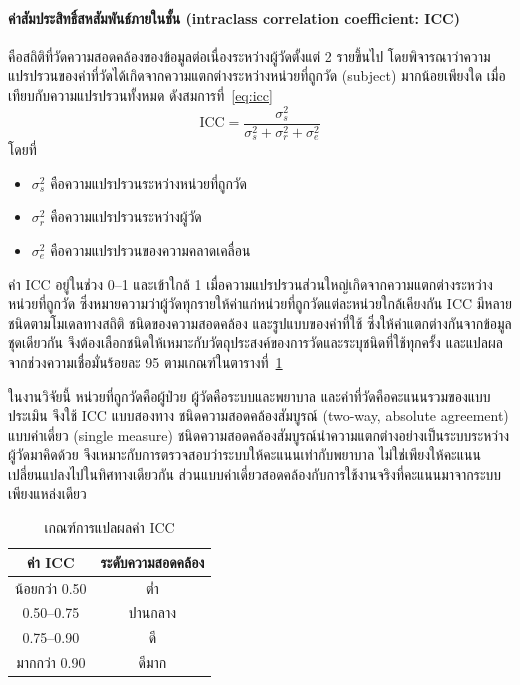 \paragraph{ค่าสัมประสิทธิ์สหสัมพันธ์ภายในชั้น (intraclass correlation coefficient: ICC)}
คือสถิติที่วัดความสอดคล้องของข้อมูลต่อเนื่องระหว่างผู้วัดตั้งแต่ 2 รายขึ้นไป
โดยพิจารณาว่าความแปรปรวนของค่าที่วัดได้เกิดจากความแตกต่างระหว่างหน่วยที่ถูกวัด (subject) มากน้อยเพียงใด
เมื่อเทียบกับความแปรปรวนทั้งหมด ดังสมการที่~\eqref{eq:icc}
\begin{equation}
\mathrm{ICC} = \frac{\sigma^2_{s}}{\sigma^2_{s} + \sigma^2_{r} + \sigma^2_{e}}
\label{eq:icc}
\end{equation}
โดยที่
\begin{itemize}[nosep, before=\vspace{-0.5\parskip}]
    \item $\sigma^2_{s}$ คือความแปรปรวนระหว่างหน่วยที่ถูกวัด
    \item $\sigma^2_{r}$ คือความแปรปรวนระหว่างผู้วัด
    \item $\sigma^2_{e}$ คือความแปรปรวนของความคลาดเคลื่อน
\end{itemize}
\vspace{-\parskip}
ค่า ICC อยู่ในช่วง 0--1 และเข้าใกล้ 1 เมื่อความแปรปรวนส่วนใหญ่เกิดจากความแตกต่างระหว่างหน่วยที่ถูกวัด
ซึ่งหมายความว่าผู้วัดทุกรายให้ค่าแก่หน่วยที่ถูกวัดแต่ละหน่วยใกล้เคียงกัน
ICC มีหลายชนิดตามโมเดลทางสถิติ ชนิดของความสอดคล้อง และรูปแบบของค่าที่ใช้ ซึ่งให้ค่าแตกต่างกันจากข้อมูลชุดเดียวกัน
จึงต้องเลือกชนิดให้เหมาะกับวัตถุประสงค์ของการวัดและระบุชนิดที่ใช้ทุกครั้ง \citep{Koo2016}
และแปลผลจากช่วงความเชื่อมั่นร้อยละ 95 ตามเกณฑ์ในตารางที่~\ref{tab:icc-interp}

ในงานวิจัยนี้ หน่วยที่ถูกวัดคือผู้ป่วย ผู้วัดคือระบบและพยาบาล และค่าที่วัดคือคะแนนรวมของแบบประเมิน
จึงใช้ ICC แบบสองทาง ชนิดความสอดคล้องสัมบูรณ์ (two-way, absolute agreement) แบบค่าเดี่ยว (single measure)
ชนิดความสอดคล้องสัมบูรณ์นำความแตกต่างอย่างเป็นระบบระหว่างผู้วัดมาคิดด้วย จึงเหมาะกับการตรวจสอบว่าระบบให้คะแนนเท่ากับพยาบาล
ไม่ใช่เพียงให้คะแนนเปลี่ยนแปลงไปในทิศทางเดียวกัน ส่วนแบบค่าเดี่ยวสอดคล้องกับการใช้งานจริงที่คะแนนมาจากระบบเพียงแหล่งเดียว

\begin{table}[htbp]
\centering
\begin{tabular}{cc}
\hline
\textbf{ค่า ICC} & \textbf{ระดับความสอดคล้อง} \\
\hline
น้อยกว่า 0.50 & ต่ำ \\
0.50--0.75 & ปานกลาง \\
0.75--0.90 & ดี \\
มากกว่า 0.90 & ดีมาก \\
\hline
\end{tabular}
\caption{เกณฑ์การแปลผลค่า ICC \citep{Koo2016}}
\label{tab:icc-interp}
\end{table}


